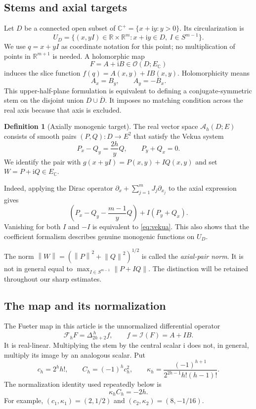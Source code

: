 \documentclass[11pt,a4paper]{article}
\numberwithin{equation}{section}
\theoremstyle{definition}
\newtheorem{definition}[theorem]{Definition}
\theoremstyle{remark}
\newcommand{\R}{\mathbb R}
\newcommand{\C}{\mathbb C}
\newcommand{\ii}{\mathrm i}
\newcommand{\Hol}{\mathcal O}
\newcommand{\AM}{\mathcal A_h}
\newcommand{\Fu}{\mathcal F_h}
\newcommand{\norm}[1]{\left\lVert#1\right\rVert}
\begin{document}
\subsection{Stems and axial targets}

Let $D$ be a connected open subset of $\C^+=\{x+\ii y:y>0\}$. Its circularization
is
\[
 U_D=\{(x,yI)\in\R\times\R^m:x+\ii y\in D,\ I\in S^{m-1}\}.
\]
We use $q=x+yI$ as coordinate notation for this point; no multiplication of
points in $\R^{m+1}$ is needed. A holomorphic map
\[
 F=A+\ii B\in\Hol(D;E_{\C})
\]
induces the slice function $f(q)=A(x,y)+IB(x,y)$. Holomorphicity means
\begin{equation}\label{eq:CR}
 A_x=B_y,\qquad A_y=-B_x.
\end{equation}
This upper-half-plane formulation is equivalent to defining a conjugate-symmetric
stem on the disjoint union $D\cup\overline D$. It imposes no matching condition
across the real axis because that axis is excluded.

\begin{definition}[Axially monogenic target]\label{def:AM}
The real vector space $\AM(D;E)$ consists of smooth pairs $(P,Q):D\to E^2$
that satisfy the Vekua system
\begin{equation}\label{eq:vekua}
 P_x-Q_y=\frac{2h}{y}Q,\qquad P_y+Q_x=0.
\end{equation}
We identify the pair with $g(x+yI)=P(x,y)+IQ(x,y)$ and set
$W=P+\ii Q\in E_{\C}$.
\end{definition}

Indeed, applying the Dirac operator
$\partial_x+\sum_{j=1}^mJ_j\partial_{x_j}$ to the axial expression gives
\[
 \left(P_x-Q_y-\frac{m-1}{y}Q\right)+I(P_y+Q_x).
\]
Vanishing for both $I$ and $-I$ is equivalent to \eqref{eq:vekua}. This also
shows that the coefficient formalism describes genuine monogenic functions
on $U_D$.

The norm $\norm W=(\norm P^2+\norm Q^2)^{1/2}$ is called the
\emph{axial-pair norm}. It is not in general equal to
$\max_{I\in S^{m-1}}\norm{P+IQ}$. The distinction will be retained throughout
our sharp estimates.

\subsection{The map and its normalization}

The Fueter map in this article is the unnormalized differential operator
\begin{equation}\label{eq:fueter-definition}
 \Fu F=\Delta_{2h+2}^{\,h}f,
 \qquad f=\mathcal I(F)=A+IB.
\end{equation}
It is real-linear. Multiplying the stem by the central scalar $\ii$ does not,
in general, multiply its image by an analogous scalar. Put
\begin{equation}\label{eq:constants}
 c_h=2^hh!,\qquad C_h=(-1)^h c_h^2,\qquad
 \kappa_h=\frac{(-1)^{h+1}}{2^{2h-1}h!(h-1)!}.
\end{equation}
The normalization identity used repeatedly below is
\begin{equation}\label{eq:calibration-constant}
 \kappa_h C_h=-2h.
\end{equation}
For example, $(c_1,\kappa_1)=(2,1/2)$ and
$(c_2,\kappa_2)=(8,-1/16)$.
\end{document}
